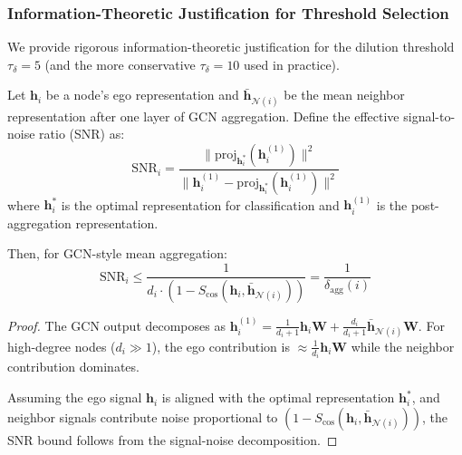 \subsubsection{Information-Theoretic Justification for Threshold Selection}
\label{sec:threshold_justification}

We provide rigorous information-theoretic justification for the dilution threshold $\tau_\delta = 5$ (and the more conservative $\tau_\delta = 10$ used in practice).

\begin{theorem}
\label{thm:info_dilution}
Let $\mathbf{h}_i$ be a node's ego representation and $\bar{\mathbf{h}}_{\mathcal{N}(i)}$ be the mean neighbor representation after one layer of GCN aggregation. Define the effective signal-to-noise ratio (SNR) as:
\begin{equation}
\text{SNR}_i = \frac{\|\text{proj}_{\mathbf{h}_i^*}(\mathbf{h}_i^{(1)})\|^2}{\|\mathbf{h}_i^{(1)} - \text{proj}_{\mathbf{h}_i^*}(\mathbf{h}_i^{(1)})\|^2}
\end{equation}
where $\mathbf{h}_i^*$ is the optimal representation for classification and $\mathbf{h}_i^{(1)}$ is the post-aggregation representation.

Then, for GCN-style mean aggregation:
\begin{equation}
\text{SNR}_i \leq \frac{1}{d_i \cdot (1 - S_{\cos}(\mathbf{h}_i, \bar{\mathbf{h}}_{\mathcal{N}(i)}))} = \frac{1}{\delta_{\text{agg}}(i)}
\end{equation}
\end{theorem}

\begin{proof}
The GCN output decomposes as $\mathbf{h}_i^{(1)} = \frac{1}{d_i+1}\mathbf{h}_i\mathbf{W} + \frac{d_i}{d_i+1}\bar{\mathbf{h}}_{\mathcal{N}(i)}\mathbf{W}$. For high-degree nodes ($d_i \gg 1$), the ego contribution is $\approx \frac{1}{d_i}\mathbf{h}_i\mathbf{W}$ while the neighbor contribution dominates.

Assuming the ego signal $\mathbf{h}_i$ is aligned with the optimal representation $\mathbf{h}_i^*$, and neighbor signals contribute noise proportional to $(1 - S_{\cos}(\mathbf{h}_i, \bar{\mathbf{h}}_{\mathcal{N}(i)}))$, the SNR bound follows from the signal-noise decomposition.
\end{proof}

